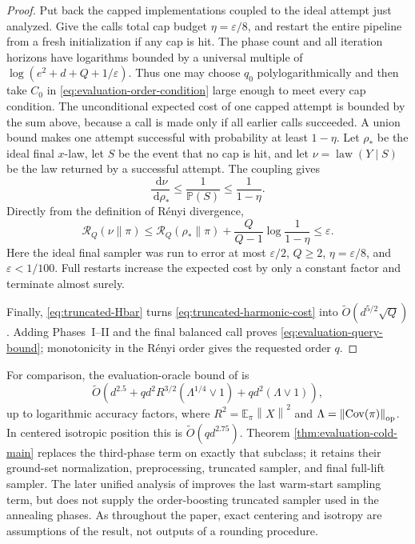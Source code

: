 \documentclass[11pt]{article}
\theoremstyle{remark}
\newcommand{\E}{\mathbb E}
\newcommand{\Pp}{\mathbb P}
\newcommand{\1}{\bm 1}
\newcommand{\eps}{\varepsilon}
\newcommand{\Cov}{\operatorname{Cov}}
\newcommand{\law}{\operatorname{law}}
\newcommand{\dd}{\,\mathrm d}
\newcommand{\norm}[1]{\left\lVert #1\right\rVert}
\begin{document}
\begin{proof}
Put back the capped implementations coupled to the ideal attempt just
analyzed.  Give the calls total cap budget $\eta=\eps/8$, and restart the
entire pipeline from a fresh initialization if any cap is hit.  The phase
count and all iteration horizons have logarithms bounded
by a universal multiple of
$\log(e^2+d+Q+1/\eps)$.  Thus one may choose $q_0$ polylogarithmically
and then take $C_0$ in \eqref{eq:evaluation-order-condition} large
enough to meet every cap condition.  The unconditional expected cost of
one capped attempt is bounded by the sum above, because a call is made
only if all earlier calls succeeded.  A union bound makes one attempt
successful with probability at least $1-\eta$.  Let $\rho_*$ be the
ideal final $x$-law, let $S$ be the event that no cap is hit, and let
$\nu=\law(Y\mid S)$ be the law returned by a successful attempt.  The
coupling gives
\[
  \frac{\dd\nu}{\dd\rho_*}\leq\frac1{\Pp(S)}\leq\frac1{1-\eta}.
\]
Directly from the definition of R\'enyi divergence,
\[
  \mathcal R_Q(\nu\|\pi)
  \leq\mathcal R_Q(\rho_*\|\pi)
     +\frac{Q}{Q-1}\log\frac1{1-\eta}
  \leq\eps.
\]
Here the ideal final sampler was run to error at most $\eps/2$,
$Q\geq2$, $\eta=\eps/8$, and $\eps<1/100$.  Full restarts increase the
expected cost by only a constant factor and terminate almost surely.

Finally, \eqref{eq:truncated-Hbar} turns
\eqref{eq:truncated-harmonic-cost} into
$\widetilde O(d^{5/2}\sqrt Q)$.  Adding Phases~I--II and the final
balanced call proves \eqref{eq:evaluation-query-bound}; monotonicity in
the R\'enyi order gives the requested order $q$.
\end{proof}

For comparison, the evaluation-oracle bound of
\citet[Corollary~1.9]{KV26zeroth} is
\[
  \widetilde O\!\left(
    d^{2.5}+qd^2R^{3/2}(\Lambda^{1/4}\vee1)
    +qd^2(\Lambda\vee1)
  \right),
\]
up to logarithmic accuracy factors, where
$R^2=\E_\pi\norm X^2$ and
$\Lambda=\norm{\Cov(\pi)}_{\rm op}$.  In centered isotropic position
this is $\widetilde O(qd^{2.75})$.  Theorem
\ref{thm:evaluation-cold-main} replaces the third-phase term on exactly
that subclass; it retains their ground-set normalization, preprocessing,
truncated sampler, and final full-lift sampler.  The later unified
analysis of \citet{KV26unified} improves the last warm-start sampling
term, but does not supply the order-boosting truncated sampler used in
the annealing phases.  As throughout the paper, exact centering and
isotropy are assumptions of the result, not outputs of a rounding
procedure.

\begingroup
\raggedright


\endgroup
\end{document}
